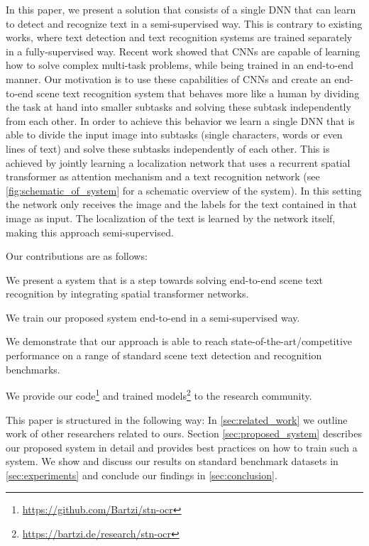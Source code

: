 \documentclass[10pt,twocolumn,letterpaper]{article}
\begin{document}
In this paper, we present a solution that consists of a single \ac{DNN} that can learn to detect and recognize text in a semi-supervised way.
This is contrary to existing works, where text detection and text recognition systems are trained separately in a fully-supervised way.
Recent work \cite{Dai2016InstanceAware} showed that \acp{CNN} are capable of learning how to solve complex multi-task problems, while being trained in an end-to-end manner.
Our motivation is to use these capabilities of \acp{CNN} and create an end-to-end scene text recognition system that behaves more like a human by dividing the task at hand into smaller subtasks and solving these subtask independently from each other.
In order to achieve this behavior we learn a single \ac{DNN} that is able to divide the input image into subtasks (single characters, words or even lines of text) and solve these subtasks independently of each other.
This is achieved by jointly learning a localization network that uses a recurrent spatial transformer \cite{Jaderberg2015Spatial,Snderby2015Recurrent} as attention mechanism and a text recognition network (see \autoref{fig:schematic_of_system} for a schematic overview of the system).
In this setting the network only receives the image and the labels for the text contained in that image as input.
The localization of the text is learned by the network itself, making this approach semi-supervised.


Our contributions are as follows:
\begin{enumerate*}[label={(\arabic*)}]
	\item We present a system that is a step towards solving end-to-end scene text recognition by integrating spatial transformer networks.
	\item We train our proposed system end-to-end in a semi-supervised way.
	\item We demonstrate that our approach is able to reach state-of-the-art/competitive performance on a range of standard scene text detection and recognition benchmarks.
	\item We provide our code\footnote{\url{https://github.com/Bartzi/stn-ocr}} and trained models\footnote{\url{https://bartzi.de/research/stn-ocr}} to the research community.
\end{enumerate*}

This paper is structured in the following way:
In \autoref{sec:related_work} we outline work of other researchers related to ours.
Section \ref{sec:proposed_system} describes our proposed system in detail and provides best practices on how to train such a system.
We show and discuss our results on standard benchmark datasets in \autoref{sec:experiments} and conclude our findings in \autoref{sec:conclusion}.
\end{document}
